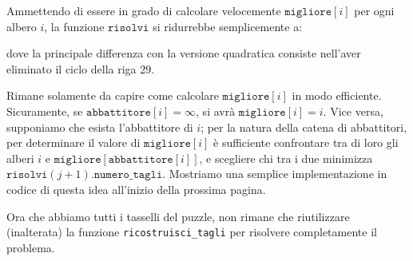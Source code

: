 Ammettendo di essere in grado di calcolare velocemente $\texttt{migliore}[i]$ per ogni albero $i$, la funzione $\texttt{risolvi}$ si ridurrebbe semplicemente a:

\colorbox{white}{}

dove la principale differenza con la versione quadratica consiste nell'aver eliminato il ciclo della riga 29.

Rimane solamente da capire come calcolare $\texttt{migliore}[i]$ in modo efficiente. Sicuramente, se $\texttt{abbattitore}[i] = \infty$, si avrà $\texttt{migliore}[i] = i$. Vice versa, supponiamo che esista l'abbattitore di $i$; per la natura della catena di abbattitori, per determinare il valore di $\texttt{migliore}[i]$ è sufficiente confrontare tra di loro gli alberi $i$ e $\texttt{migliore}[\texttt{abbattitore}[i]]$, e scegliere chi tra i due minimizza $\texttt{risolvi}(j + 1).\texttt{numero\_tagli}$. Mostriamo una semplice implementazione in codice di questa idea all'inizio della prossima pagina.

\colorbox{white}{}

Ora che abbiamo tutti i tasselli del puzzle, non rimane che riutilizzare (inalterata) la funzione \texttt{ricostruisci\_tagli} per risolvere completamente il problema.

\afterpage{\nopagecolor}
